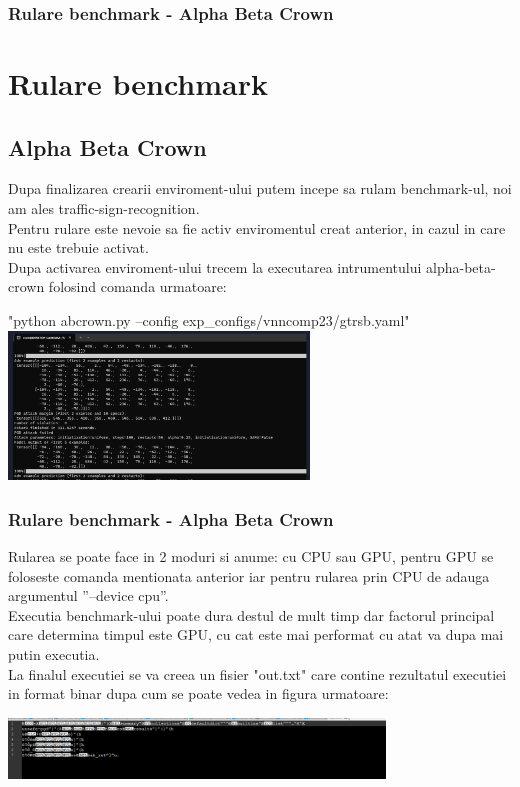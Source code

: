 \documentclass{beamer}
\newcommand\tab[1][1cm]{\hspace*{#1}}
\begin{document}
\begin{frame}

\frametitle{Rulare benchmark - Alpha Beta Crown}

\section{Rulare benchmark}
\subsection{Alpha Beta Crown}
\tab Dupa finalizarea crearii enviroment-ului putem incepe sa rulam benchmark-ul, noi am ales traffic-sign-recognition.\\
\tab Pentru rulare este nevoie sa fie activ enviromentul creat anterior, in cazul in care nu este trebuie activat.\\
\tab Dupa activarea enviroment-ului trecem la executarea intrumentului alpha-beta-crown folosind comanda urmatoare:\\
\begin{center}
"python abcrown.py --config exp\_configs/vnncomp23/gtrsb.yaml"
    \includegraphics[width=8cm]{7.png}
\end{center}
\end{frame}

\begin{frame}

\frametitle{Rulare benchmark - Alpha Beta Crown}
\tab Rularea se poate face in 2 moduri si anume: cu CPU sau GPU, pentru GPU se foloseste comanda mentionata anterior iar pentru rularea prin CPU de adauga argumentul ”–device cpu”.\\
\tab Executia benchmark-ului poate dura destul de mult timp dar factorul principal care determina timpul este GPU, cu cat este mai performat cu atat va dupa mai putin executia.\\
\tab La finalul executiei se va creea un fisier "out.txt" care contine rezultatul executiei in format binar dupa cum se poate vedea in figura urmatoare:\\
\begin{center}
    \includegraphics[width=10cm]{6.png}
\end{center}

\end{frame}
\end{document}
